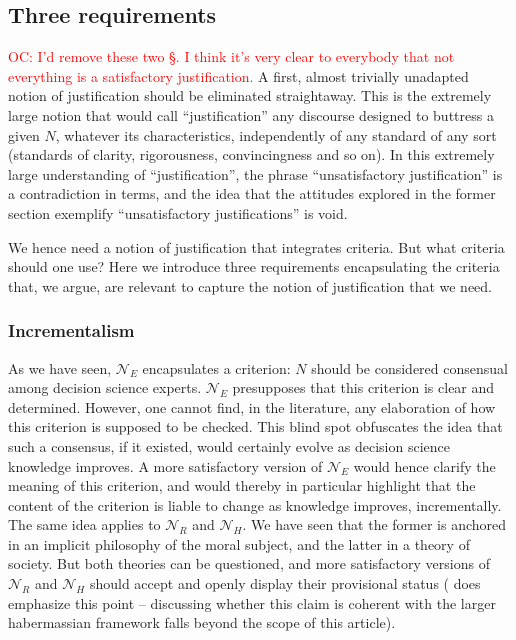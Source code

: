 \documentclass[preprint, french, english, 11pt, authoryear]{elsarticle}%
\newcommand{\commentOC}[1]{\textcolor{red}{OC: #1}}
\begin{document}
\subsection{Three requirements}
\commentOC{I’d remove these two §. I think it’s very clear to everybody that not everything is a satisfactory justification.} A first, almost trivially unadapted notion of justification should be eliminated straightaway. This is the extremely large notion %
that would call ``justification'' any discourse designed to buttress a given $N$, whatever its characteristics, independently of any standard of any sort (standards of clarity, rigorousness, convincingness and so on). In this extremely large understanding of ``justification'', the phrase ``unsatisfactory justification'' is a contradiction in terms, and the idea that the attitudes explored in the former section exemplify ``unsatisfactory justifications'' is void.

We hence need a notion of justification that integrates criteria. But what criteria should one use? Here we introduce three requirements encapsulating the criteria that, we argue, are relevant to capture the notion of justification that we need.

\subsubsection{Incrementalism}
As we have seen, $\mathscr{N}_E$ encapsulates a criterion: $N$ should be considered consensual among decision science experts. $\mathscr{N}_E$ presupposes that this criterion is clear and determined. However, one cannot find, in the literature, any elaboration of how this criterion is supposed to be checked. This blind spot obfuscates the idea that such a consensus, if it existed, would certainly evolve as decision science knowledge improves. A more satisfactory version of $\mathscr{N}_E$ would hence clarify the meaning of this criterion, and would thereby in particular highlight that the content of the criterion is liable to change as knowledge improves, incrementally. The same idea applies to $\mathscr{N}_{R}$ and $\mathscr{N}_{H}$. We have seen that the former is anchored in an implicit philosophy of the moral subject, and the latter in a theory of society. But both theories can be questioned, and more satisfactory versions of $\mathscr{N}_{R}$ and $\mathscr{N}_{H}$ should accept and openly display their provisional status (\cite{habermas_moralbewustsein_1983} does emphasize this point -- discussing whether this claim is coherent with the larger habermassian framework falls beyond the scope of this article).
\end{document}
